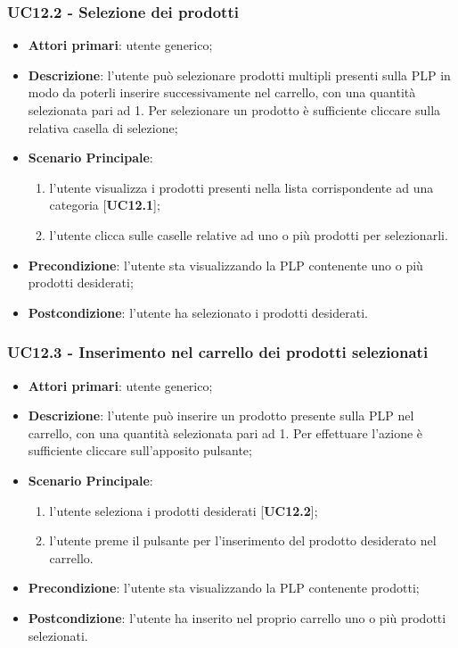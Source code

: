 \subsubsection{UC12.2 - Selezione dei prodotti}
\begin{itemize}
\item \textbf{Attori primari}: utente generico;
\item \textbf{Descrizione}: l'utente può selezionare prodotti multipli presenti sulla PLP in modo da poterli inserire successivamente nel carrello, con una quantità selezionata pari ad 1. Per selezionare un prodotto è sufficiente cliccare sulla relativa casella di selezione;
\item \textbf{Scenario Principale}:
\begin{enumerate}
\item l'utente visualizza i prodotti presenti nella lista corrispondente ad una categoria [\textbf{UC12.1}];
\item l'utente clicca sulle caselle relative ad uno o più prodotti per selezionarli.
\end{enumerate}
\item \textbf{Precondizione}: l'utente sta visualizzando la PLP contenente uno o più prodotti desiderati;
\item \textbf{Postcondizione}: l'utente ha selezionato i prodotti desiderati.
\end{itemize}

\subsubsection{UC12.3 - Inserimento nel carrello dei prodotti selezionati}
\begin{itemize}
\item \textbf{Attori primari}: utente generico;
\item \textbf{Descrizione}: l'utente può inserire un prodotto presente sulla PLP nel carrello, con una quantità selezionata pari ad 1. Per effettuare l'azione è sufficiente cliccare sull'apposito pulsante;
\item \textbf{Scenario Principale}:
\begin{enumerate}
\item l'utente seleziona i prodotti desiderati [\textbf{UC12.2}];
\item l'utente preme il pulsante per l'inserimento del prodotto desiderato nel carrello.
\end{enumerate}
\item \textbf{Precondizione}: l'utente sta visualizzando la PLP contenente prodotti;
\item \textbf{Postcondizione}: l'utente ha inserito nel proprio carrello uno o più prodotti selezionati.
\end{itemize}

